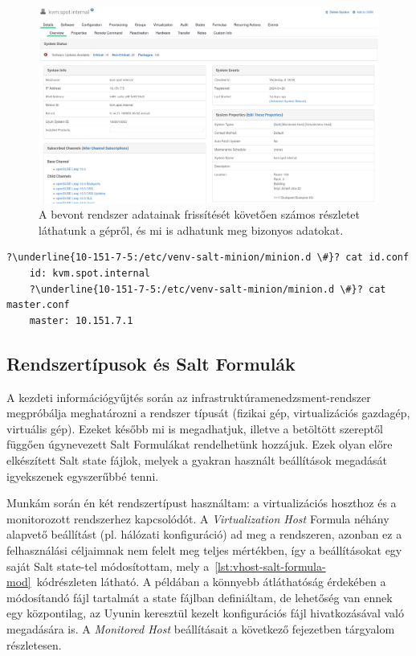 \begin{figure}[ht]
	\centering
	\includegraphics[width=15cm]{figures/uyuni-system-details.png}
	\caption{A bevont rendszer adatainak frissítését követően számos részletet láthatunk a gépről, és mi is adhatunk meg bizonyos adatokat.}
	\label{fig:uyuni-system-details}
\end{figure}

\begin{lstlisting}[caption=A manuális konfiguráció során létrehozott állományok.,label=lst:salt-client-config,escapechar=?]
	?\underline{10-151-7-5:/etc/venv-salt-minion/minion.d \#}? cat id.conf
	id: kvm.spot.internal
	?\underline{10-151-7-5:/etc/venv-salt-minion/minion.d \#}? cat master.conf
	master: 10.151.7.1
\end{lstlisting}

\subsection{Rendszertípusok és Salt Formulák}
A kezdeti információgyűjtés során az infrastruktúramenedzsment-rendszer megpróbálja meghatározni a rendszer típusát (fizikai gép, virtualizációs gazdagép, virtuális gép). Ezeket később mi is megadhatjuk, illetve a betöltött szereptől függően úgynevezett Salt Formulákat rendelhetünk hozzájuk. Ezek olyan előre elkészített Salt state fájlok, melyek a gyakran használt beállítások megadását igyekszenek egyszerűbbé tenni.

Munkám során én két rendszertípust használtam: a virtualizációs hoszthoz és a monitorozott rendszerhez kapcsolódót. A \textit{Virtualization Host} Formula néhány alapvető beállítást (pl. hálózati konfiguráció) ad meg a rendszeren, azonban ez a felhasználási céljaimnak nem felelt meg teljes mértékben, így a beállításokat egy saját Salt state-tel módosítottam, mely a~\ref{lst:vhost-salt-formula-mod}~kódrészleten látható. A példában a könnyebb átláthatóság érdekében a módosítandó fájl tartalmát a state fájlban definiáltam, de lehetőség van ennek egy központilag, az Uyunin keresztül kezelt konfigurációs fájl hivatkozásával való megadására is.
A \textit{Monitored Host} beállításait a következő fejezetben tárgyalom részletesen.


